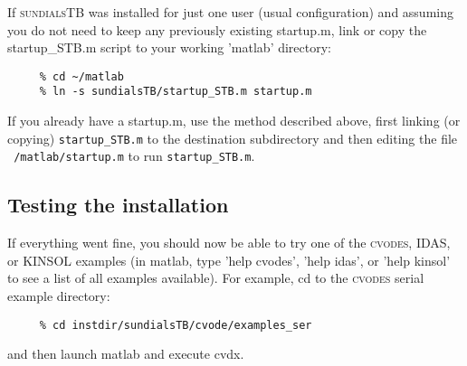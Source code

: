 \documentclass[titlepage,10pt]{article}
\newcommand{\sundialsTB}{{\normalfont\scshape sundialsTB}}
\newcommand{\cvodes}{{\normalfont\scshape cvodes}}
\begin{document}
If {\sundialsTB} was installed for just one user (usual configuration) and
assuming you do not need to keep any previously existing startup.m, link 
or copy the startup\_STB.m script to your working 'matlab' directory:

\begin{verbatim}
     % cd ~/matlab
     % ln -s sundialsTB/startup_STB.m startup.m
\end{verbatim}

If you already have a startup.m, use the method described above, first linking 
(or copying) {\tt startup\_STB.m} to the destination subdirectory and then editing 
the file {\tt ~/matlab/startup.m} to run {\tt startup\_STB.m}.

\subsection{Testing the installation}

If everything went fine, you should now be able to try one of the {\cvodes}, IDAS,
or KINSOL examples (in matlab, type 'help cvodes', 'help idas', or 'help kinsol' 
to see a list of all examples available). For example, cd to the {\cvodes} serial 
example directory:
\begin{verbatim}
     % cd instdir/sundialsTB/cvode/examples_ser
\end{verbatim}
and then launch matlab and execute cvdx.
\end{document}
